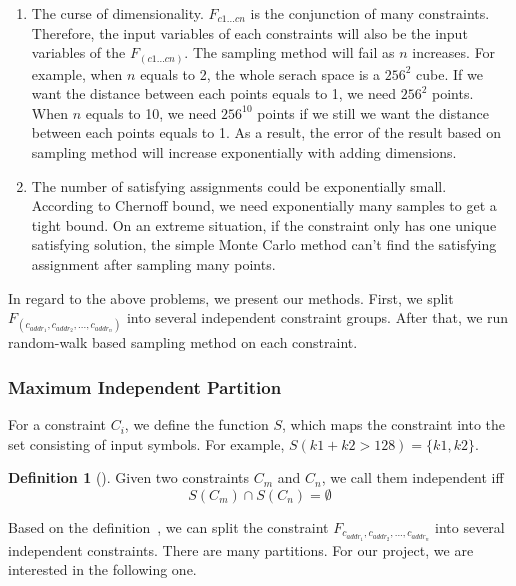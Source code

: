 \begin{enumerate}
      \item The curse of dimensionality. $F_{c1...cn}$ is the conjunction of many
      constraints. Therefore, the input variables of each constraints will also be 
      the input variables of the $F_(c1...cn)$. The sampling method will fail as 
      $n$ increases. For example, when $n$ equals to 2, the whole serach space is 
      a $256^2$ cube. If we want the distance between each points equals to 1,
      we need $256^2$ points. When $n$ equals to 10, we need $256^{10}$ points if we 
      still we want the distance between each points equals to 1. As a result, the 
      error of the result based on sampling method will increase exponentially with
      adding dimensions. 

      \item The number of satisfying assignments could be exponentially small.
      According to Chernoff bound, we need exponentially many samples to get 
      a tight bound. On an extreme situation, if the constraint only has one unique
      satisfying solution, the simple Monte Carlo method can't find the satisfying
      assignment after sampling many points.
\end{enumerate}

In regard to the above problems, we present our methods. First, we split 
$F_(c_{addr_1},c_{addr_2},...,c_{addr_n})$ into several independent constraint groups. After
that, we run random-walk based sampling method on each constraint.

\subsubsection{Maximum Independent Partition}

For a constraint $C_i$, we define the function $S$, which maps
the constraint into the set consisting of input symbols. For example, 
$S(k1 + k2 > 128) = \{k1, k2\}$.

\theoremstyle{definition}
\newtheorem{definition}{Definition}[section]

\begin{definition}[]
      \label{independentC}
      Given two constraints $C_m$ and $C_n$, we call them independent iff 
      $$S(C_m) \cap S(C_n) = \emptyset$$
\end{definition}

Based on the definition~\label{independentC}, we can split
the constraint $F_{c_{addr_1},c_{addr_2},...,c_{addr_n}}$ into several 
independent constraints. There are many partitions. For our project, 
we are interested in the following one.

